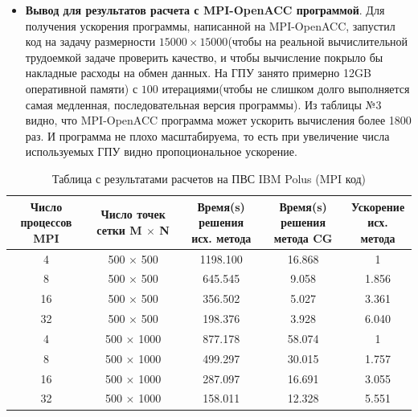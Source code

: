 \documentclass{article}
\begin{document}
\begin{itemize}
    \item \textbf{Вывод для результатов расчета с MPI-OpenACC программой}. Для получения ускорения программы, написанной на MPI-OpenACC, запустил код на задачу размерности $15000\times 15000$(чтобы на реальной вычислительной трудоемкой задаче проверить качество, и чтобы вычисление покрыло бы накладные расходы на обмен данных. На ГПУ занято примерно 12GB оперативной памяти) с $100$ итерациями(чтобы не слишком долго выполняется самая медленная, последовательная версия программы). Из таблицы №3 видно, что MPI-OpenACC программа может ускорить вычисления более 1800 раз. И программа не плохо масштабируема, то есть при увеличение числа используемых ГПУ видно пропоциональное ускорение.
\end{itemize}

\begin{table}[!htp]
\centering
\begin{tabular}{c|c|c|c|c}
\hline
 \makecell[c]{Число процессов \\ MPI} & \makecell[c]{Число точек сетки \\ M $\times$ N }& \makecell[c]{Время(s) решения\\ исх. метода} & \makecell[c]{Время(s) решения \\ метода CG}& \makecell[c]{Ускорение\\исх. метода} \\ \hline
4 & 500 $\times$ 500 & 1198.100 & 16.868 &1 \\
8 & 500 $\times$ 500 & 645.545 & 9.058 &1.856 \\
16 & 500 $\times$ 500 & 356.502 & 5.027 &3.361 \\
32 & 500 $\times$ 500 & 198.376 & 3.928 &6.040 \\ \hline
4 & 500 $\times$ 1000 & 877.178 & 58.074 &1 \\
8 & 500 $\times$ 1000 & 499.297 & 30.015 & 1.757 \\
16 & 500 $\times$ 1000 & 287.097 & 16.691 &3.055 \\
32 & 500 $\times$ 1000 & 158.011 & 12.328 &5.551 \\ 
\end{tabular}
\caption{Таблица с результатами расчетов на ПВС IBM Polus (MPI код)}
\end{table}
\end{document}
